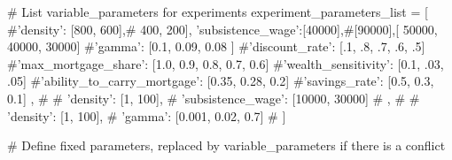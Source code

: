 # List variable_parameters for experiments
    experiment_parameters_list = [
         {
            #'density': [800, 600],# 400, 200],
            'subsistence_wage':[40000],#[90000],[ 50000, 40000, 30000]
            #'gamma': [0.1, 0.09, 0.08 ]
            #'discount_rate': [.1, .8, .7, .6, .5]
            #'max_mortgage_share': [1.0, 0.9, 0.8, 0.7, 0.6]
            #'wealth_sensitivity': [0.1, .03, .05]
            #'ability_to_carry_mortgage': [0.35, 0.28, 0.2]
            #'savings_rate': [0.5, 0.3, 0.1]
        },
        # {
        #     'density': [1, 100],
        #     'subsistence_wage': [10000, 30000]
        # },
        # {
        #     'density': [1, 100],
        #     'gamma': [0.001, 0.02, 0.7]
        # }
    ]
    
    # Define fixed parameters, replaced by variable_parameters if there is a conflict
